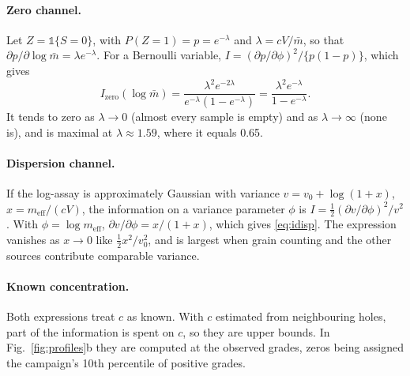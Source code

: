 \documentclass[11pt,a4paper]{article}
\theoremstyle{remark}
\newcommand{\meff}{m_{\mathrm{eff}}}
\newcommand{\mbar}{\bar m}
\begin{document}
\paragraph{Zero channel.} Let $Z = \mathbb{1}\{S = 0\}$, with $P(Z = 1) = p = e^{-\lambda}$ and $\lambda = cV/\mbar$, so that $\partial p/\partial\log\mbar = \lambda e^{-\lambda}$. For a Bernoulli variable, $I = (\partial p/\partial\phi)^2/\{p(1 - p)\}$, which gives
\[
I_{\mathrm{zero}}(\log\mbar) = \frac{\lambda^2 e^{-2\lambda}}{e^{-\lambda}(1 - e^{-\lambda})} = \frac{\lambda^2 e^{-\lambda}}{1 - e^{-\lambda}}.
\]
It tends to zero as $\lambda \to 0$ (almost every sample is empty) and as $\lambda \to \infty$ (none is), and is maximal at $\lambda \approx 1.59$, where it equals 0.65.

\paragraph{Dispersion channel.} If the log-assay is approximately Gaussian with variance $v = v_0 + \log(1 + x)$, $x = \meff/(cV)$, the information on a variance parameter $\phi$ is $I = \tfrac12(\partial v/\partial\phi)^2/v^2$. With $\phi = \log\meff$, $\partial v/\partial\phi = x/(1 + x)$, which gives \eqref{eq:idisp}. The expression vanishes as $x \to 0$ like $\tfrac12 x^2/v_0^2$, and is largest when grain counting and the other sources contribute comparable variance.

\paragraph{Known concentration.} Both expressions treat $c$ as known. With $c$ estimated from neighbouring holes, part of the information is spent on $c$, so they are upper bounds. In Fig.~\ref{fig:profiles}b they are computed at the observed grades, zeros being assigned the campaign's 10th percentile of positive grades.
\end{document}
